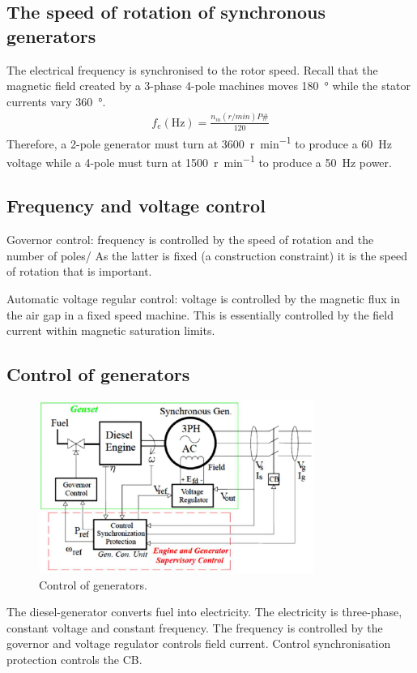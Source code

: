 \subsection{The speed of rotation of synchronous generators}
The electrical frequency is synchronised to the rotor speed. Recall that the magnetic field created by a 3-phase 4-pole machines moves \SI{180}{\degree} while the stator currents vary \SI{360}{\degree}.
\begin{gather}
    f_e(\si{\hertz}) = \frac{n_m\left(\si{r\per min}\right)P\#}{120}
\end{gather}
Therefore, a 2-pole generator must turn at \SI{3600}{r\per min} to produce a \SI{60}{\hertz} voltage while a 4-pole must turn at \SI{1500}{r\per min} to produce a \SI{50}{\hertz} power.
\subsection{Frequency and voltage control}
Governor control: frequency is controlled by the speed of rotation and the number of poles/ As the latter is fixed (a construction constraint) it is the speed of rotation that is important.

Automatic voltage regular control: voltage is controlled by the magnetic flux in the air gap in a fixed speed machine. This is essentially controlled by the field current within magnetic saturation limits.
\subsection{Control of generators}
\begin{figure}[H]
    \centering
    \includegraphics[width = 0.8\textwidth]{img/figure78.png}
    \caption{Control of generators.}
\end{figure}
The diesel-generator converts fuel into electricity. The electricity is three-phase, constant voltage and constant frequency. The frequency is controlled by the governor and voltage regulator controls field current. Control synchronisation protection controls the CB.
